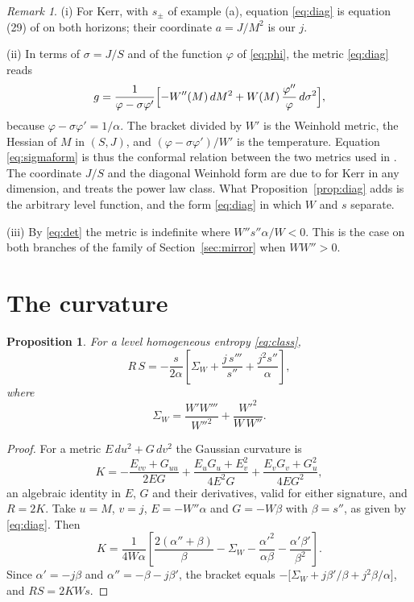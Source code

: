 \documentclass[11pt]{article}
\newtheorem{proposition}{Proposition}
\theoremstyle{definition}
\theoremstyle{remark}
\newtheorem{remark}{Remark}
\newcommand{\SW}{\Sigma_{W}}
\begin{document}
\begin{remark}\label{rem:prior}
(i) For Kerr, with $s_{\pm}$ of example (a), equation \eqref{eq:diag} is equation (29) of \cite{ABP15} on both horizons; their coordinate $a=J/M^{2}$ is our $j$.

(ii) In terms of $\sigma=J/S$ and of the function $\varphi$ of \eqref{eq:phi}, the metric \eqref{eq:diag} reads
\begin{equation}\label{eq:sigmaform}
g=\frac{1}{\varphi-\sigma\varphi'}\Bigl[-W''(M)\,dM^{2}+W(M)\,\frac{\varphi''}{\varphi}\,d\sigma^{2}\Bigr],
\end{equation}
because $\varphi-\sigma\varphi'=1/\alpha$. The bracket divided by $W'$ is the Weinhold metric, the Hessian of $M$ in $(S,J)$, and $(\varphi-\sigma\varphi')/W'$ is the temperature. Equation \eqref{eq:sigmaform} is thus the conformal relation between the two metrics used in \cite{AP06}. The coordinate $J/S$ and the diagonal Weinhold form are due to \cite{AP06} for Kerr in any dimension, and \cite{ABP06} treats the power law class. What Proposition~\ref{prop:diag} adds is the arbitrary level function, and the form \eqref{eq:diag} in which $W$ and $s$ separate.

(iii) By \eqref{eq:det} the metric is indefinite where $W''s''\alpha/W<0$. This is the case on both branches of the family of Section~\ref{sec:mirror} when $WW''>0$.
\end{remark}

\section{The curvature}\label{sec:curv}

\begin{proposition}\label{prop:curv}
For a level homogeneous entropy \eqref{eq:class},
\begin{equation}\label{eq:RS}
R\,S=-\frac{s}{2\alpha}\left[\SW+\frac{j\,s'''}{s''}+\frac{j^{2}s''}{\alpha}\right],
\end{equation}
where
\begin{equation}\label{eq:sigmaW}
\SW=\frac{W'W'''}{W''^{2}}+\frac{W'^{2}}{W\,W''} .
\end{equation}
\end{proposition}

\begin{proof}
For a metric $E\,du^{2}+G\,dv^{2}$ the Gaussian curvature is
\begin{equation}\label{eq:gauss}
K=-\frac{E_{vv}+G_{uu}}{2EG}+\frac{E_{u}G_{u}+E_{v}^{2}}{4E^{2}G}+\frac{E_{v}G_{v}+G_{u}^{2}}{4EG^{2}} ,
\end{equation}
an algebraic identity in $E$, $G$ and their derivatives, valid for either signature, and $R=2K$. Take $u=M$, $v=j$, $E=-W''\alpha$ and $G=-W\beta$ with $\beta=s''$, as given by \eqref{eq:diag}. Then
\[
K=\frac{1}{4W\alpha}\left[\frac{2(\alpha''+\beta)}{\beta}-\SW-\frac{\alpha'^{2}}{\alpha\beta}-\frac{\alpha'\beta'}{\beta^{2}}\right].
\]
Since $\alpha'=-j\beta$ and $\alpha''=-\beta-j\beta'$, the bracket equals $-\bigl[\SW+j\beta'/\beta+j^{2}\beta/\alpha\bigr]$, and $RS=2KWs$.
\end{proof}
\end{document}
